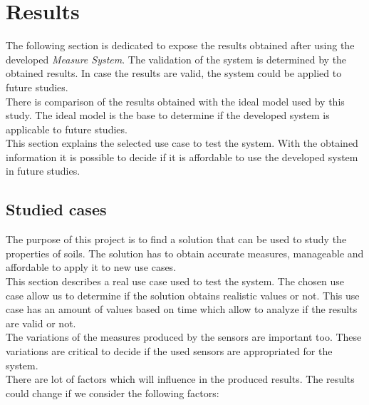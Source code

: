 
\chapter{Results}
\newpage

The following section is dedicated to expose the results obtained after using the developed \textit{Measure System}. The validation of the system is determined by the obtained results. In case the results are valid, the system could be applied to future studies.\\

There is comparison of the results obtained with the ideal model used by this study. The ideal model is the base to determine if the developed system is applicable to future studies.\\

This section explains the selected use case to test the system. With the obtained information it is possible to decide if it is affordable to use the developed system in future studies.

\section{Studied cases}

The purpose of this project is to find a solution that can be used to study the properties of soils. The solution has to obtain accurate measures, manageable and affordable to apply it to new use cases.\\

This section describes a real use case used to test the system. The chosen use case allow us to determine if the solution obtains realistic values or not. This use case has an amount of values based on time which allow to analyze if the results are valid or not.\\

The variations of the measures produced by the sensors are important too. These variations are critical to decide if the used sensors are appropriated for the system.\\

There are lot of factors which will influence in the produced results. The results could change if we consider the following factors:

